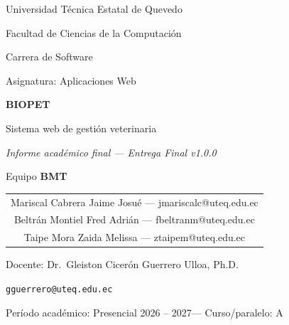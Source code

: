 \documentclass[12pt,a4paper]{report}
\makeatletter
\newcommand{\universidad}{Universidad T\'ecnica Estatal de Quevedo}
\newcommand{\facultad}{Facultad de Ciencias de la Computaci\'on}
\newcommand{\carrera}{Carrera de Software}
\newcommand{\asignatura}{Aplicaciones Web}
\newcommand{\docente}{Dr.\ Gleiston Cicer\'on Guerrero Ulloa, Ph.D.}
\newcommand{\correodocente}{gguerrero@uteq.edu.ec}
\newcommand{\periodoacademico}{Presencial 2026 -- 2027}
\newcommand{\cursoparalelo}{A}
\newcommand{\equipo}{BMT}
\makeatother
\begin{document}

\begin{titlepage}
  \centering
  \vspace*{0.3cm}

  {\large \universidad \par}
  {\large \facultad \par}
  \vspace{0.3cm}
  {\normalsize \carrera \par}
  {\normalsize Asignatura: \asignatura \par}

  \vspace{1.6cm}
  {\Huge \bfseries BIOPET \par}
  \vspace{0.4cm}
  {\Large Sistema web de gesti\'on veterinaria \par}
  \vspace{0.6cm}
  {\Large\itshape Informe acad\'emico final --- Entrega Final v1.0.0 \par}

  \vspace{1.6cm}
  {\large Equipo \textbf{\equipo} \par}
  \vspace{0.6cm}

  {\normalsize
    \begin{tabular}{c}
      Mariscal Cabrera Jaime Josu\'e \quad --- \quad jmariscalc@uteq.edu.ec \\
      Beltr\'an Montiel Fred Adri\'an \quad --- \quad fbeltranm@uteq.edu.ec \\
      Taipe Mora Zaida Melissa \quad --- \quad ztaipem@uteq.edu.ec \\
    \end{tabular}
    \par
  }

  \vspace{1.4cm}
  {\normalsize Docente: \docente \par}
  {\normalsize \texttt{\correodocente} \par}
  \vspace{0.3cm}
  {\normalsize Per\'iodo acad\'emico: \periodoacademico \quad --- \quad Curso/paralelo: \cursoparalelo \par}


\end{titlepage}
\end{document}
